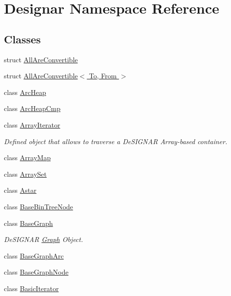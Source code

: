 \hypertarget{namespace_designar}{}\section{Designar Namespace Reference}
\label{namespace_designar}
\subsection*{Classes}
\begin{DoxyCompactItemize}
\item 
struct \hyperlink{struct_designar_1_1_all_are_convertible}{All\+Are\+Convertible}
\item 
struct \hyperlink{struct_designar_1_1_all_are_convertible_3_01_to_00_01_from_01_4}{All\+Are\+Convertible$<$ To, From $>$}
\item 
class \hyperlink{class_designar_1_1_arc_heap}{Arc\+Heap}
\item 
class \hyperlink{class_designar_1_1_arc_heap_cmp}{Arc\+Heap\+Cmp}
\item 
class \hyperlink{class_designar_1_1_array_iterator}{Array\+Iterator}
\begin{DoxyCompactList}\small\item\em Defined object that allows to traverse a De\+S\+I\+G\+N\+AR Array-\/based container. \end{DoxyCompactList}\item 
class \hyperlink{class_designar_1_1_array_map}{Array\+Map}
\item 
class \hyperlink{class_designar_1_1_array_set}{Array\+Set}
\item 
class \hyperlink{class_designar_1_1_astar}{Astar}
\item 
class \hyperlink{class_designar_1_1_base_bin_tree_node}{Base\+Bin\+Tree\+Node}
\item 
class \hyperlink{class_designar_1_1_base_graph}{Base\+Graph}
\begin{DoxyCompactList}\small\item\em De\+S\+I\+G\+N\+AR \hyperlink{class_designar_1_1_graph}{Graph} Object. \end{DoxyCompactList}\item 
class \hyperlink{class_designar_1_1_base_graph_arc}{Base\+Graph\+Arc}
\item 
class \hyperlink{class_designar_1_1_base_graph_node}{Base\+Graph\+Node}
\item 
class \hyperlink{class_designar_1_1_basic_iterator}{Basic\+Iterator}
\item 

\end{DoxyCompactItemize}
